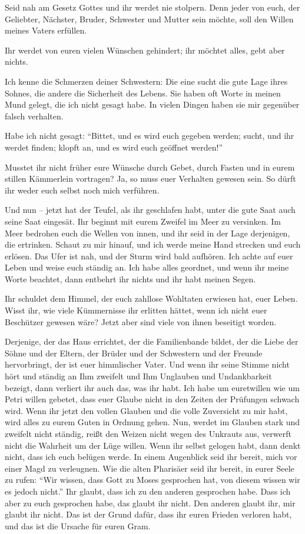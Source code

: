 Seid nah am Gesetz Gottes und ihr werdet nie stolpern. Denn jeder von euch, der Geliebter, Nächster, Bruder, Schwester und Mutter sein möchte, soll den Willen meines Vaters erfüllen.


Ihr werdet von euren vielen Wünschen gehindert; ihr möchtet alles, gebt aber nichts.

Ich kenne die Schmerzen deiner Schwestern: Die eine sucht die gute Lage ihres Sohnes, die andere die Sicherheit des Lebens. Sie haben oft Worte in meinen Mund gelegt, die ich nicht gesagt habe. In vielen Dingen haben sie mir gegenüber falsch verhalten.

Habe ich nicht gesagt: "`Bittet, und es wird euch gegeben werden; sucht, und ihr werdet finden; klopft an, und es wird euch geöffnet werden!"' 

Musstet ihr nicht früher eure Wünsche durch Gebet, durch Fasten und in eurem stillen Kämmerlein vortragen? Ja, so muss euer Verhalten gewesen sein. So dürft ihr weder euch selbst noch mich verführen. 

Und nun -- jetzt hat der Teufel, als ihr geschlafen habt, unter die gute Saat auch seine Saat eingesät. Ihr beginnt mit eurem Zweifel im Meer zu versinken. Im Meer bedrohen euch die Wellen von innen, und ihr seid in der Lage derjenigen, die ertrinken. Schaut zu mir hinauf, und ich werde meine Hand strecken und euch erlösen. Das Ufer ist nah, und der Sturm wird bald aufhören. Ich achte auf euer Leben und weise euch ständig an. Ich habe alles geordnet, und wenn ihr meine Worte beachtet, dann entbehrt ihr nichts und ihr habt meinen Segen. 

Ihr schuldet dem Himmel, der euch zahllose Wohltaten erwiesen hat, euer Leben. Wisst ihr, wie viele Kümmernisse ihr erlitten hättet, wenn ich nicht euer Beschützer gewesen wäre? Jetzt aber sind viele von ihnen beseitigt worden. 

Derjenige, der das Haus errichtet, der die Familienbande bildet, der die Liebe der Söhne und der Eltern, der Brüder und der Schwestern und der Freunde hervorbringt, der ist euer himmlischer Vater. Und wenn ihr seine Stimme nicht hört und ständig an Ihm zweifelt und Ihm Unglauben und Undankbarkeit bezeigt, dann verliert ihr auch das, was ihr habt. Ich habe um euretwillen wie um Petri willen gebetet, dass euer Glaube nicht in den Zeiten der Prüfungen schwach wird. Wenn ihr jetzt den vollen Glauben und die volle Zuversicht zu mir habt, wird alles zu eurem Guten in Ordnung gehen. Nun, werdet im Glauben stark und zweifelt nicht ständig, reißt den Weizen nicht wegen des Unkrauts aus, verwerft nicht die Wahrheit um der Lüge willen. Wenn ihr selbst gelogen habt, dann denkt nicht, dass ich euch belügen werde. In einem Augenblick seid ihr bereit, mich vor einer Magd zu verleugnen. Wie die alten Pharisäer seid ihr bereit, in eurer Seele zu rufen: "`Wir wissen, dass Gott zu Moses gesprochen hat, von diesem wissen wir es jedoch nicht."' Ihr glaubt, dass ich zu den anderen gesprochen habe. Dass ich aber zu euch gesprochen habe, das glaubt ihr nicht. Den anderen glaubt ihr, mir glaubt ihr nicht. Das ist der Grund dafür, dass ihr euren Frieden verloren habt, und das ist die Ursache für euren Gram. 

